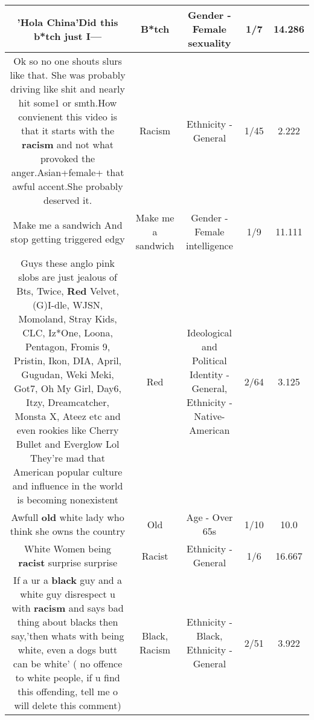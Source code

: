 \documentclass[11pt]{article}
\newlength\mylength
\begin{document}
\begin{center}
\begin{longtable}{|C{.65\mylength}|C{.30\mylength}|C{.12\mylength}|C{.12\mylength}|C{.12\mylength}|}
  \small 'Hola China'Did this \textbf{b*tch} just I—\normalsize   & B*tch & Gender - Female sexuality & 1/7 & 14.286 \\  \hline
  \small Ok so no one shouts slurs like that. She was probably driving like shit and nearly hit some1 or smth.How convienent this video is that it starts with the \textbf{racism} and not what provoked the anger.Asian+female+ that awful accent.She probably deserved it.\normalsize   & Racism & Ethnicity - General & 1/45 & 2.222 \\  \hline
  \small Make me a sandwich And stop getting triggered edgy\normalsize   & Make me a sandwich & Gender - Female intelligence & 1/9 & 11.111 \\  \hline
  \small Guys these anglo pink slobs are  just jealous of Bts, Twice, \textbf{R\textbf{ed}} Velvet, (G)I-dle, WJSN, Momoland, Stray Kids, CLC, Iz*One, Loona, Pentagon, Fromis 9, Pristin, Ikon, DIA, April, Gugudan, Weki Meki, Got7, Oh My Girl, Day6, Itzy, Dreamcatcher, Monsta X, Ateez etc and even rookies like Cherry Bullet and Everglow Lol They're mad that American popular culture and influence in the world is becoming nonexistent\normalsize   & Red &  Ideological and Political Identity - General, Ethnicity - Native-American & 2/64 & 3.125 \\  \hline
  \small Awfull \textbf{old} white lady who think she owns the country\normalsize   & Old & Age - Over 65s & 1/10 & 10.0 \\  \hline
  \small White Women being \textbf{racist} surprise surprise\normalsize   & Racist & Ethnicity - General & 1/6 & 16.667 \\  \hline
  \small If a ur a \textbf{black} guy and a white guy disrespect u with \textbf{racism} and says bad thing about blacks then say,'then whats with being white, even a dogs butt can be white' ( no offence to white people, if u find this offending, tell me o will delete this comment)\normalsize   & Black, Racism & Ethnicity - Black, Ethnicity - General & 2/51 & 3.922 \\  \hline

\end{longtable}
\end{center}
\end{document}
